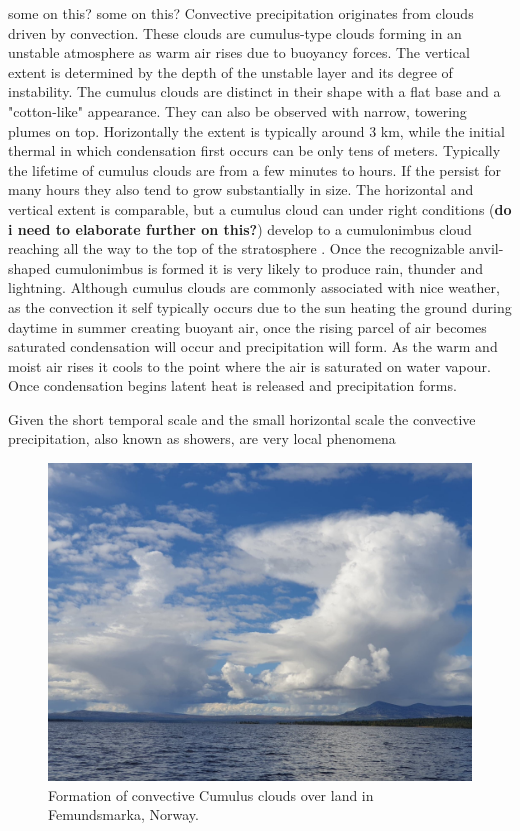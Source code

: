 some on this?
some on this?
Convective precipitation originates from clouds driven by convection. These clouds are cumulus-type clouds forming in an unstable atmosphere as warm air rises due to buoyancy forces. The vertical extent is determined by the depth of the unstable layer and its degree of instability. The cumulus clouds are distinct in their shape with a flat base and a "cotton-like" appearance. They can also be observed with narrow, towering plumes on top. Horizontally the extent is typically around 3 km, while the initial thermal in which condensation first occurs can be only tens of meters. Typically the lifetime of cumulus clouds are from a few minutes to hours. If the persist for many hours they also tend to grow substantially in size. The horizontal and vertical extent is comparable, but a cumulus cloud can under right conditions (\textbf{do i need to elaborate further on this?}) develop to a cumulonimbus cloud reaching all the way to the top of the stratosphere \cite{rogers}. Once the recognizable anvil-shaped cumulonimbus is formed it is very likely to produce rain, thunder and lightning. Although cumulus clouds are commonly associated with nice weather, as the convection it self typically occurs due to the sun heating the ground during daytime in summer creating buoyant air, once the rising parcel of air becomes saturated condensation will occur and precipitation will form. As the warm and moist air rises it cools to the point where the air is saturated on water vapour. Once condensation begins latent heat is released and precipitation forms.

Given the short temporal scale and the small horizontal scale the convective precipitation, also known as showers, are very local phenomena 
\begin{figure}
    \centering
    \includegraphics[scale=0.2]{figures/cumulus_bilde.jpg}
    \caption{Formation of convective Cumulus clouds over land in Femundsmarka, Norway.
    \cite{cumulus}}
    \label{fig:cumulus}
\end{figure}

